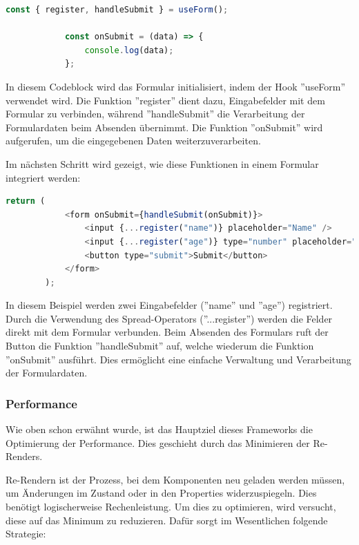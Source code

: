             \begin{lstlisting}[language=JavaScript]
            const { register, handleSubmit } = useForm(); 
            
            const onSubmit = (data) => {  
                console.log(data); 
            };
            \end{lstlisting}
            
            In diesem Codeblock wird das Formular initialisiert, indem der Hook ''useForm'' verwendet wird. Die Funktion ''register'' dient dazu, Eingabefelder mit dem Formular zu verbinden, während ''handleSubmit'' die Verarbeitung der Formulardaten beim Absenden übernimmt. Die Funktion ''onSubmit'' wird aufgerufen, um die eingegebenen Daten weiterzuverarbeiten.
            
            Im nächsten Schritt wird gezeigt, wie diese Funktionen in einem Formular integriert werden:
            
            \begin{lstlisting}[language=JavaScript]
        return (
            <form onSubmit={handleSubmit(onSubmit)}>  
                <input {...register("name")} placeholder="Name" />  
                <input {...register("age")} type="number" placeholder="Age" /> 
                <button type="submit">Submit</button>  
            </form>
        );
            \end{lstlisting}
            
            In diesem Beispiel werden zwei Eingabefelder (''name'' und ''age'') registriert. Durch die Verwendung des Spread-Operators (''...register'') werden die Felder direkt mit dem Formular verbunden. Beim Absenden des Formulars ruft der Button die Funktion ''handleSubmit'' auf, welche wiederum die Funktion ''onSubmit'' ausführt. Dies ermöglicht eine einfache Verwaltung und Verarbeitung der Formulardaten.

        \subsubsection{Performance \label{sec:perfomanceHookForm}}
        Wie oben schon erwähnt wurde, ist das Hauptziel dieses Frameworks die Optimierung der Performance. Dies geschieht durch das Minimieren der Re-Renders. 

        Re-Rendern ist der Prozess, bei dem Komponenten neu geladen werden müssen, um Änderungen im Zustand oder in den Properties widerzuspiegeln. Dies benötigt logischerweise Rechenleistung. Um dies zu optimieren, wird versucht, diese auf das Minimum zu reduzieren. Dafür sorgt im Wesentlichen folgende Strategie:\cite{prompt12_pollak}

